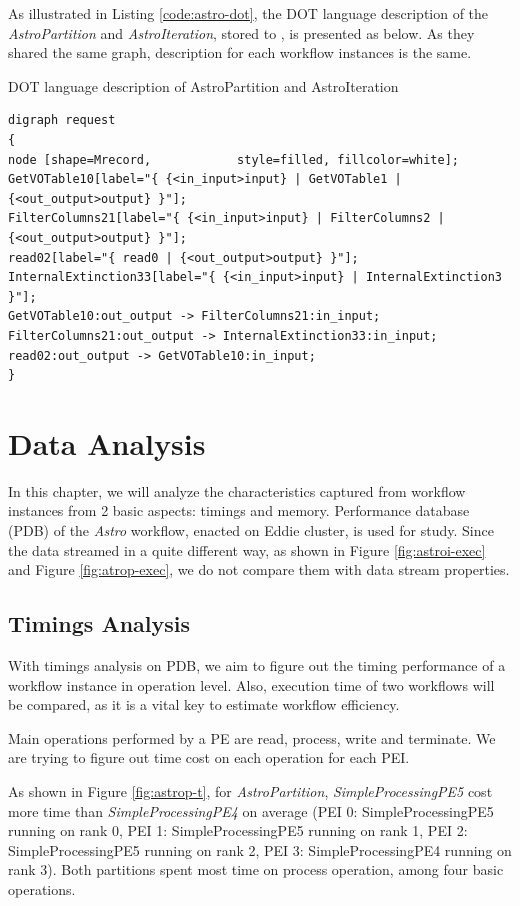 \documentclass[10pt,twoside,openright,logo]{report}
\begin{document}
As illustrated in Listing \ref{code:astro-dot}, the DOT language description of the \textit{AstroPartition} and \textit{AstroIteration}, stored to \textit{}, is presented as below. As they shared the same graph, description for each workflow instances is the same.
\begin{listing}
\caption{DOT language description of AstroPartition and AstroIteration}
\label{code:astro-dot}
\begin{verbatim}
digraph request
{
node [shape=Mrecord,            style=filled, fillcolor=white];
GetVOTable10[label="{ {<in_input>input} | GetVOTable1 | {<out_output>output} }"];
FilterColumns21[label="{ {<in_input>input} | FilterColumns2 | {<out_output>output} }"];
read02[label="{ read0 | {<out_output>output} }"];
InternalExtinction33[label="{ {<in_input>input} | InternalExtinction3 }"];
GetVOTable10:out_output -> FilterColumns21:in_input;
FilterColumns21:out_output -> InternalExtinction33:in_input;
read02:out_output -> GetVOTable10:in_input;
}
\end{verbatim}
\end{listing}

\chapter{Data Analysis}
In this chapter, we will analyze the characteristics captured from workflow instances from 2 basic aspects: timings and memory. Performance database (PDB) of the \textit{Astro} workflow, enacted on Eddie cluster, is used for study. Since the data streamed in a quite different way, as shown in Figure \ref{fig:astroi-exec} and Figure \ref{fig:atrop-exec}, we do not compare them with data stream properties.

\section{Timings Analysis}
With timings analysis on PDB, we aim to figure out the timing performance of a workflow instance in operation level.  Also, execution time of two workflows will be compared, as it is a vital key to estimate workflow efficiency.

Main operations performed by a PE are read, process, write and terminate. We are trying to figure out time cost on each operation for each PEI.

As shown in Figure \ref{fig:astrop-t}, for \textit{AstroPartition}, \textit{SimpleProcessingPE5} cost more time than \textit{SimpleProcessingPE4} on average (PEI 0: SimpleProcessingPE5 running on rank 0, PEI 1: SimpleProcessingPE5 running on rank 1, PEI 2: SimpleProcessingPE5 running on rank 2, PEI 3: SimpleProcessingPE4 running on rank 3). Both partitions spent most time on process operation, among four basic operations.
\end{document}
